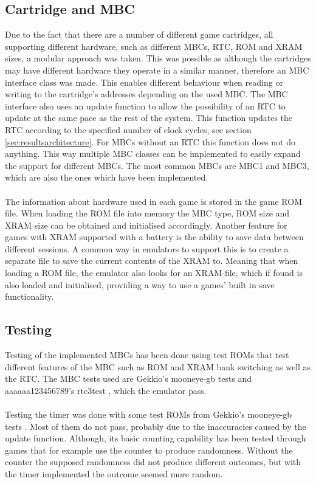 \subsection{Cartridge and MBC}
Due to the fact that there are a number of different game cartridges, all supporting different hardware, such as different MBCs, RTC, ROM and XRAM sizes, a modular approach was taken. 
This was possible as although the cartridges may have different hardware they operate in a similar manner, therefore an MBC interface class was made.
This enables different behaviour when reading or writing to the cartridge's addresses depending on the used MBC. The MBC interface also uses an update function to allow the possibility of an RTC to update at the same pace as the rest of the system. This function updates the RTC according to the specified number of clock cycles, see section \ref{sec:resultsarchitecture}. For MBCs without an RTC this function does not do anything. This way multiple MBC classes can be implemented to easily expand the support for different MBCs. The most common MBCs are MBC1 and MBC3, which are also the ones which have been implemented.
\\\\
The information about hardware used in each game is stored in the game ROM file.
When loading the ROM file into memory the MBC type, ROM size and XRAM size can be obtained and initialised accordingly. 
Another feature for games with XRAM supported with a battery is the ability to save data between different sessions.
A common way in emulators to support this is to create a separate file to save the current contents of the XRAM to. Meaning that when loading a ROM file, the emulator also looks for an XRAM-file, which if found is also loaded and initialised, providing a way to use a games' built in save functionality.

\subsection{Testing}
Testing of the implemented MBCs has been done using test ROMs that test different features of the MBC such as ROM and XRAM bank switching as well as the RTC. The MBC tests used are Gekkio's mooneye-gb tests \cite{Gekkio-Mooneye} and aaaaaa123456789's rtc3test \cite{mbc3test}, which the emulator pass.
\\\\
Testing the timer was done with some test ROMs from Gekkio's mooneye-gb tests \cite{Gekkio-Mooneye}. Most of them do not pass, probably due to the inaccuracies caused by the update function. Although, its basic counting capability has been tested through games that for example use the counter to produce randomness. Without the counter the supposed randomness did not produce different outcomes, but with the timer implemented the outcome seemed more random.

